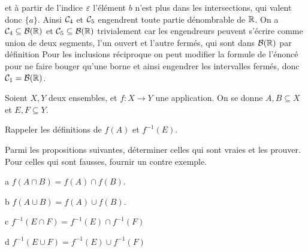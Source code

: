 \documentclass[french]{report}
\begin{document}
\begin{exo}
\begin{q}{4}
{        et à partir de l'indice \(\varepsilon\) l'élément \(b\) n'est plus dans les intersections,
        qui valent donc \(\{a\}\). Ainsi \(\mathcal{C}_4\) et \(\mathcal{C}_5\) engendrent toute
        partie dénombrable de \(\mathbb{R}\). On a \(\mathcal{C}_4\subseteq\mathcal{B}(\mathbb{R})\) et \(\mathcal{C}_5\subseteq\mathcal{B}(\mathbb{R})\)
        trivialement car les engendreurs peuvent s'écrire comme union de deux segments, l'un
        ouvert et l'autre fermés, qui sont dans \(\mathcal{B}(\mathbb{R})\) par définition Pour les inclusions
        réciproque on peut modifier la formule de l'énoncé pour ne faire bouger qu'une borne
        et ainsi engendrer les intervalles fermés, donc \(\mathcal{C}_1=\mathcal{B}(\mathbb{R})\).}
    \end{q}
\end{exo}

\begin{exo}
    Soient \(X,Y\) deux ensembles, et \(f\colon X\to Y\) une application.
    On se donne \(A,B\subseteq X\) et \(E,F\subseteq Y\).
    \begin{q}{1}
        Rappeler les définitions de \(f(A)\) et \(f^{-1}(E)\).
    \end{q}
    \begin{q}{2}
        Parmi les propositions suivantes, déterminer celles qui sont vraies et les
        prouver. Pour celles qui sont fausses, fournir un contre exemple.
        \begin{q}{a}
            \(f(A\cap B) = f(A)\cap f(B)\).
        \end{q}
        \begin{q}{b}
            \(f(A\cup B) = f(A)\cup f(B)\).
        \end{q}
        \begin{q}{c}
            \(f^{-1}(E\cap F)=f^{-1}(E)\cap f^{-1}(F)\)
        \end{q}
        \begin{q}{d}
            \(f^{-1}(E\cup F)=f^{-1}(E)\cup f^{-1}(F)\)
        \end{q}
    \end{q}
\end{exo}
\end{document}
